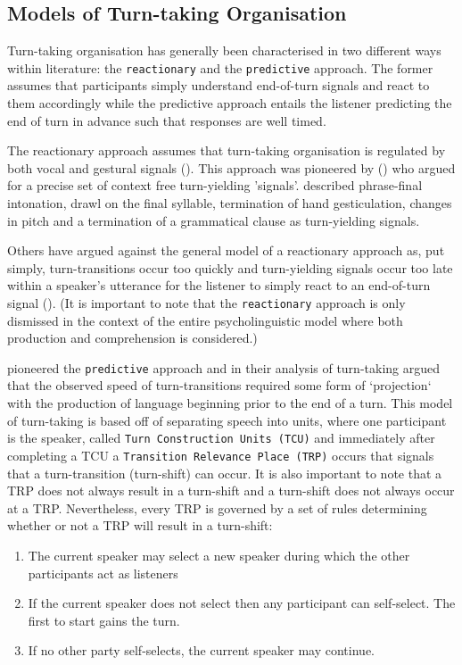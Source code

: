 \documentclass[logo,bsc,singlespacing,parskip]{infthesis}
\begin{document}
\subsection{Models of Turn-taking Organisation} 
Turn-taking organisation has generally been characterised in two different ways within literature: the \texttt{reactionary} and the \texttt{predictive} approach.
The former assumes that participants simply understand end-of-turn signals and react to them accordingly while the predictive approach entails the listener predicting the end of turn in advance such that responses are well timed. 

The reactionary approach assumes that turn-taking organisation is regulated by both vocal and gestural signals (\cite{Yngve1970}). This approach was pioneered by (\cite{Duncan1972, Duncan1973, Duncan1974, Duncan1977}) who argued for a precise set of context free turn-yielding 'signals'. \cite{Duncan1972} described phrase-final intonation, drawl on the final syllable, termination of hand gesticulation, changes in pitch and a termination of a grammatical clause as turn-yielding signals. 

Others have argued against the general model of a reactionary approach as, put simply, turn-transitions occur too quickly and turn-yielding signals occur too late within a speaker's utterance for the listener to simply react to an end-of-turn signal (\cite{LevTor2015, Riest2015}). (It is important to note that the \texttt{reactionary} approach is only dismissed in the context of the entire psycholinguistic model where both production and comprehension is considered.) 

\cite{Sacks1974} pioneered the \texttt{predictive} approach and in their analysis of turn-taking argued that the observed speed of turn-transitions required some form of `projection` with the production of language beginning prior to the end of a turn. This model of turn-taking is based off of separating speech into units, where one participant is the speaker, called \texttt{Turn Construction Units (TCU)} and immediately after completing a TCU a \texttt{Transition Relevance Place (TRP)} occurs that signals that a turn-transition (turn-shift) can occur. It is also important to note that a TRP does not always result in a turn-shift and a turn-shift does not always occur at a TRP. Nevertheless, every TRP is governed by a set of rules determining whether or not a TRP will result in a turn-shift: 
\begin{enumerate}
    \item{} The current speaker may select a new speaker during which the other participants act as listeners 
    \item{} If the current speaker does not select then any participant can self-select. The first to start gains the turn.
    \item{} If no other party self-selects, the current speaker may continue. 
\end{enumerate} 
\end{document}
